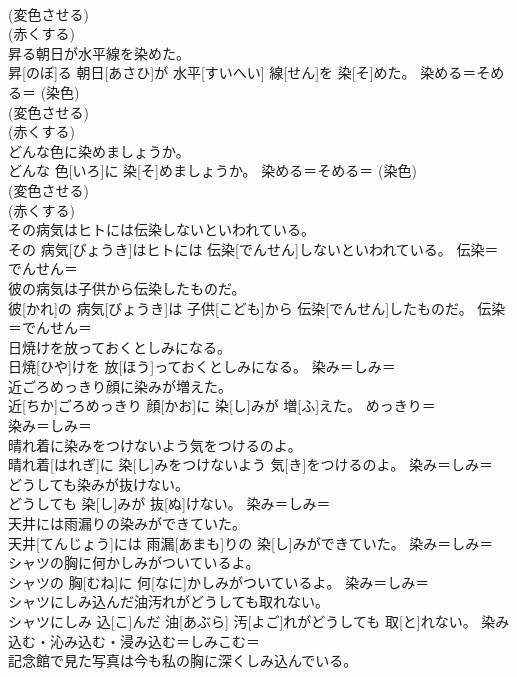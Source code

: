 \documentclass[8pt]{extreport}
\begin{document}
\begin{CJK}{UTF8}{min}
{\\	(変色させる) 
\\	(赤くする) 
\\	昇る朝日が水平線を染めた。	
\\	昇[のぼ]る 朝日[あさひ]が 水平[すいへい] 線[せん]を 染[そ]めた。	染める＝そめる＝ (染色) 
\\	(変色させる) 
\\	(赤くする) 
\\	どんな色に染めましょうか。	
\\	どんな 色[いろ]に 染[そ]めましょうか。	染める＝そめる＝ (染色) 
\\	(変色させる) 
\\	(赤くする) 
\\	その病気はヒトには伝染しないといわれている。	
\\	その 病気[びょうき]はヒトには 伝染[でんせん]しないといわれている。	伝染＝でんせん＝ 
\\	彼の病気は子供から伝染したものだ。	
\\	彼[かれ]の 病気[びょうき]は 子供[こども]から 伝染[でんせん]したものだ。	伝染＝でんせん＝ 
\\	日焼けを放っておくとしみになる。	
\\	日焼[ひや]けを 放[ほう]っておくとしみになる。	染み＝しみ＝ 
\\	近ごろめっきり顔に染みが増えた。	
\\	近[ちか]ごろめっきり 顔[かお]に 染[し]みが 増[ふ]えた。	めっきり＝ 
\\	染み＝しみ＝ 
\\	晴れ着に染みをつけないよう気をつけるのよ。	
\\	晴れ着[はれぎ]に 染[し]みをつけないよう 気[き]をつけるのよ。	染み＝しみ＝ 
\\	どうしても染みが抜けない。	
\\	どうしても 染[し]みが 抜[ぬ]けない。	染み＝しみ＝ 
\\	天井には雨漏りの染みができていた。	
\\	天井[てんじょう]には 雨漏[あまも]りの 染[し]みができていた。	染み＝しみ＝ 
\\	シャツの胸に何かしみがついているよ。	
\\	シャツの 胸[むね]に 何[なに]かしみがついているよ。	染み＝しみ＝ 
\\	シャツにしみ込んだ油汚れがどうしても取れない。	
\\	シャツにしみ 込[こ]んだ 油[あぶら] 汚[よご]れがどうしても 取[と]れない。	染み込む・沁み込む・浸み込む＝しみこむ＝ 
\\	記念館で見た写真は今も私の胸に深くしみ込んでいる。	
}
\end{CJK}
\end{document}
